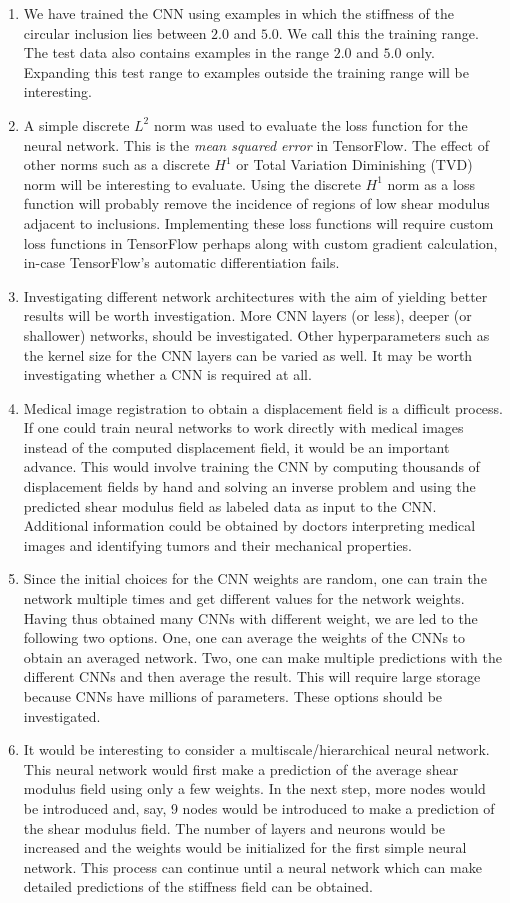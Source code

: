 \documentclass[12pt]{article}
\begin{document}
\begin{enumerate}
\item{We have trained the CNN using examples in which the stiffness of the circular inclusion lies between $2.0$ and $5.0$. We call this the training range. The test data also contains examples in the range $2.0$ and $5.0$ only. Expanding this test range to examples outside the training range will be interesting.}
\item{A simple discrete $L^2$ norm was used to evaluate the loss function for the neural network. This is the \textit{mean squared error} in TensorFlow. The effect of other norms such as a discrete $H^1$ or Total Variation Diminishing (TVD) norm will be interesting to evaluate. Using the discrete $H^1$ norm as a loss function will probably remove the incidence of regions of low shear modulus adjacent to inclusions. Implementing these loss functions will require custom loss functions in TensorFlow perhaps along with custom gradient calculation, in-case TensorFlow's automatic differentiation fails.}
\item{Investigating different network architectures with the aim of yielding better results will be worth investigation. More CNN layers (or less), deeper (or shallower) networks, should be investigated. Other hyperparameters such as the kernel size for the CNN layers can be varied as well. It may be worth investigating whether a CNN is required at all.}
\item{Medical image registration to obtain a displacement field is a difficult process. If one could train neural networks to work directly with medical images instead of the computed displacement field, it would be an important advance. This would involve training the CNN by computing thousands of displacement fields by hand and solving an inverse problem and using the predicted shear modulus field as labeled data as input to the CNN. Additional information could be obtained by doctors interpreting medical images and identifying tumors and their mechanical properties.}
\item{Since the initial choices for the CNN weights are random, one can train the network multiple times and get different values for the network weights. Having thus obtained many CNNs with different weight, we are led to the following two options. One, one can average the weights of the CNNs to obtain an averaged network. Two, one can make multiple predictions with the different CNNs and then average the result. This will require large storage because CNNs have millions of parameters. These options should be investigated.}
\item{It would be interesting to consider a multiscale/hierarchical neural network. This neural network would first make a prediction of the average shear modulus field using only a few weights. In the next step, more nodes would be introduced and, say, 9 nodes would be introduced to make a prediction of the shear modulus field. The number of layers and neurons would be increased and the weights would be initialized for the first simple neural network. This process can continue until a neural network which can make detailed predictions of the stiffness field can be obtained. }

\end{enumerate}
\end{document}

